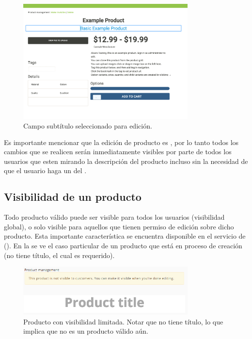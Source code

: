 		\begin{figure}[H]
			\centering
			\includegraphics[width=0.8\textwidth]{figuras/productos/interfaz_edicion_editando_subtitulo.png}

			\caption{Campo subtítulo seleccionado para edición.}
			\label{figure:features:interfaz_edicion_editando_subtitulo}
		\end{figure}

		Es importante mencionar que la edición de producto es \reactive, por lo tanto todos los cambios que se realicen serán inmediatamente visibles por parte de todos los usuarios que esten mirando la descripción del producto incluso sin la necesidad de que el usuario haga un  del \websiteINT.


	\subsection{Visibilidad de un producto}
	
		Todo producto válido puede ser visible para todos los usuarios (visibilidad global), o solo visible para aquellos que tienen permiso de edición sobre dicho producto. Esta importante característica se encuentra disponible en el servicio de \shopifyNAME(). En la  se ve el caso particular de un producto que está en proceso de creación (no tiene título, el cual es requerido).

		\begin{figure}[H]
			\centering
			\includegraphics[width=0.8\textwidth]{figuras/solution/product/visibility/new.png}

			\caption{Producto con visibilidad limitada. Notar que no tiene título, lo que implica que no es un producto válido aún.}
			\label{figure:solution:product:visibility:new}
		\end{figure}

